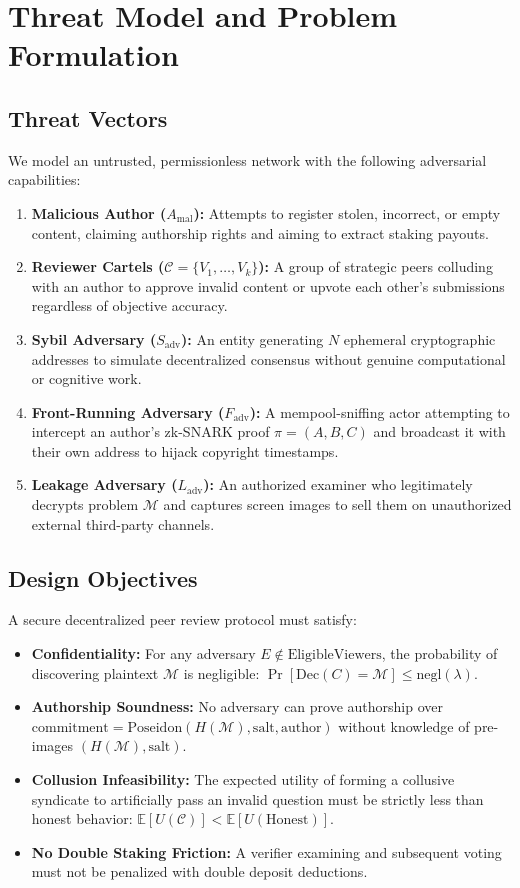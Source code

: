 \documentclass[conference,10pt]{IEEEtran}
\begin{document}
\section{Threat Model and Problem Formulation}

\subsection{Threat Vectors}
We model an untrusted, permissionless network with the following adversarial capabilities:
\begin{enumerate}
    \item \textbf{Malicious Author ($A_{\text{mal}}$):} Attempts to register stolen, incorrect, or empty content, claiming authorship rights and aiming to extract staking payouts.
    \item \textbf{Reviewer Cartels ($\mathcal{C} = \{V_1, \dots, V_k\}$):} A group of strategic peers colluding with an author to approve invalid content or upvote each other's submissions regardless of objective accuracy.
    \item \textbf{Sybil Adversary ($S_{\text{adv}}$):} An entity generating $N$ ephemeral cryptographic addresses to simulate decentralized consensus without genuine computational or cognitive work.
    \item \textbf{Front-Running Adversary ($F_{\text{adv}}$):} A mempool-sniffing actor attempting to intercept an author's zk-SNARK proof $\pi = (A, B, C)$ and broadcast it with their own address to hijack copyright timestamps.
    \item \textbf{Leakage Adversary ($L_{\text{adv}}$):} An authorized examiner who legitimately decrypts problem $\mathcal{M}$ and captures screen images to sell them on unauthorized external third-party channels.
\end{enumerate}

\subsection{Design Objectives}
A secure decentralized peer review protocol must satisfy:
\begin{itemize}
    \item \textbf{Confidentiality:} For any adversary $E \notin \text{EligibleViewers}$, the probability of discovering plaintext $\mathcal{M}$ is negligible: $\Pr[\text{Dec}(C) = \mathcal{M}] \le \text{negl}(\lambda)$.
    \item \textbf{Authorship Soundness:} No adversary can prove authorship over $\text{commitment} = \text{Poseidon}(H(\mathcal{M}), \text{salt}, \text{author})$ without knowledge of pre-images $(H(\mathcal{M}), \text{salt})$.
    \item \textbf{Collusion Infeasibility:} The expected utility of forming a collusive syndicate to artificially pass an invalid question must be strictly less than honest behavior: $\mathbb{E}[U(\mathcal{C})] < \mathbb{E}[U(\text{Honest})]$.
    \item \textbf{No Double Staking Friction:} A verifier examining and subsequent voting must not be penalized with double deposit deductions.
\end{itemize}
\end{document}
